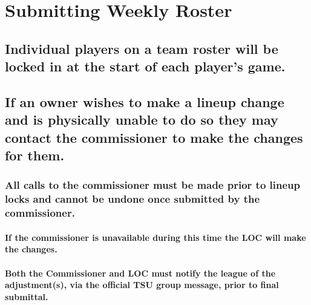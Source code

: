 \documentclass[
]{book}
\begin{document}
\hypertarget{submitting-weekly-roster}{%
\section{Submitting Weekly Roster}\label{submitting-weekly-roster}}

\hypertarget{individual-players-on-a-team-roster-will-be-locked-in-at-the-start-of-each-players-game.}{%
\subsection{Individual players on a team roster will be locked in at the start of each player's game.}\label{individual-players-on-a-team-roster-will-be-locked-in-at-the-start-of-each-players-game.}}

\hypertarget{if-an-owner-wishes-to-make-a-lineup-change-and-is-physically-unable-to-do-so-they-may-contact-the-commissioner-to-make-the-changes-for-them.}{%
\subsection{If an owner wishes to make a lineup change and is physically unable to do so they may contact the commissioner to make the changes for them.}\label{if-an-owner-wishes-to-make-a-lineup-change-and-is-physically-unable-to-do-so-they-may-contact-the-commissioner-to-make-the-changes-for-them.}}

\hypertarget{all-calls-to-the-commissioner-must-be-made-prior-to-lineup-locks-and-cannot-be-undone-once-submitted-by-the-commissioner.}{%
\subsubsection{All calls to the commissioner must be made prior to lineup locks and cannot be undone once submitted by the commissioner.}\label{all-calls-to-the-commissioner-must-be-made-prior-to-lineup-locks-and-cannot-be-undone-once-submitted-by-the-commissioner.}}

\hypertarget{if-the-commissioner-is-unavailable-during-this-time-the-loc-will-make-the-changes.}{%
\paragraph{If the commissioner is unavailable during this time the LOC will make the changes.}\label{if-the-commissioner-is-unavailable-during-this-time-the-loc-will-make-the-changes.}}

\hypertarget{both-the-commissioner-and-loc-must-notify-the-league-of-the-adjustments-via-the-official-tsu-group-message-prior-to-final-submittal.}{%
\paragraph{Both the Commissioner and LOC must notify the league of the adjustment(s), via the official TSU group message, prior to final submittal.}\label{both-the-commissioner-and-loc-must-notify-the-league-of-the-adjustments-via-the-official-tsu-group-message-prior-to-final-submittal.}}
\end{document}
